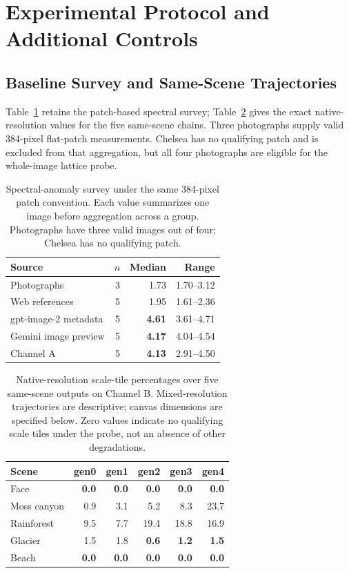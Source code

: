 \documentclass[sigplan,10pt,nonacm]{acmart}
\begin{document}
\section{Experimental Protocol and Additional Controls}
\label{app:protocol}
\subsection{Baseline Survey and Same-Scene Trajectories}
Table~\ref{tab:baseline} retains the patch-based spectral survey; Table~\ref{tab:chains} gives the exact native-resolution values for the five same-scene chains. Three photographs supply valid 384-pixel flat-patch measurements. Chelsea has no qualifying patch and is excluded from that aggregation, but all four photographs are eligible for the whole-image lattice probe.

\begin{table}[t]
\caption{Spectral-anomaly survey under the same 384-pixel patch convention. Each value summarizes one image before aggregation across a group. Photographs have three valid images out of four; Chelsea has no qualifying patch.}
\label{tab:baseline}
\centering\small
\begin{tabular}{lrrr}
\toprule
Source & $n$ & Median & Range \\
\midrule
Photographs & 3 & 1.73 & 1.70--3.12 \\
Web references & 5 & 1.95 & 1.61--2.36 \\
gpt-image-2 metadata & 5 & \textbf{4.61} & 3.61--4.71 \\
Gemini image preview & 5 & \textbf{4.17} & 4.04--4.54 \\
Channel A & 5 & \textbf{4.13} & 2.91--4.50 \\
\bottomrule
\end{tabular}
\end{table}

\begin{table}[t]
\caption{Native-resolution scale-tile percentages over five same-scene outputs on Channel B. Mixed-resolution trajectories are descriptive; canvas dimensions are specified below. Zero values indicate no qualifying scale tiles under the probe, not an absence of other degradations.}
\label{tab:chains}
\centering\small
\begin{tabular}{lrrrrr}
\toprule
Scene & gen0 & gen1 & gen2 & gen3 & gen4 \\
\midrule
Face & \textbf{0.0} & \textbf{0.0} & \textbf{0.0} & \textbf{0.0} & \textbf{0.0} \\
Moss canyon & 0.9 & 3.1 & 5.2 & 8.3 & 23.7 \\
Rainforest & 9.5 & 7.7 & 19.4 & 18.8 & 16.9 \\
Glacier & 1.5 & 1.8 & \textbf{0.6} & \textbf{1.2} & \textbf{1.5} \\
Beach & \textbf{0.0} & \textbf{0.0} & \textbf{0.0} & \textbf{0.0} & \textbf{0.0} \\
\bottomrule
\end{tabular}
\end{table}
\end{document}
